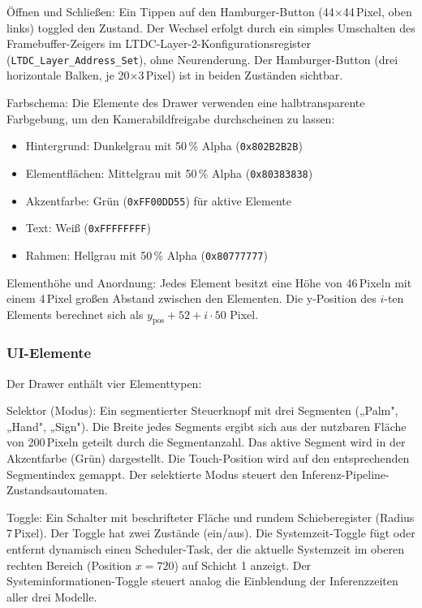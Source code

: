 Öffnen und Schließen: Ein Tippen auf den Hamburger-Button (44$\times$44\,Pixel, oben links) toggled den Zustand. Der Wechsel erfolgt durch ein simples Umschalten des Framebuffer-Zei\-gers im LTDC-Layer-2-Konfigurationsregister (\texttt{LTDC\_Layer\_Address\_Set}), ohne Neurenderung. Der Hamburger-Button (drei horizontale Balken, je 20$\times$3\,Pixel) ist in beiden Zuständen sichtbar.

Farbschema: Die Elemente des Drawer verwenden eine halbtransparente Farbgebung, um den Kamerabildfreigabe durchscheinen zu lassen:
\begin{itemize}
    \item Hintergrund: Dunkelgrau mit 50\,\% Alpha (\texttt{0x802B2B2B})
    \item Elementflächen: Mittelgrau mit 50\,\% Alpha (\texttt{0x80383838})
    \item Akzentfarbe: Grün (\texttt{0xFF00DD55}) für aktive Elemente
    \item Text: Weiß (\texttt{0xFFFFFFFF})
    \item Rahmen: Hellgrau mit 50\,\% Alpha (\texttt{0x80777777})
\end{itemize}

Elementhöhe und Anordnung: Jedes Element besitzt eine Höhe von 46\,Pixeln mit einem 4\,Pixel großen Abstand zwischen den Elementen. Die y-Position des $i$-ten Elements berechnet sich als $y_{\text{pos}} + 52 + i \cdot 50$ Pixel.

\subsubsection{UI-Elemente}\label{ssub:ui-elemente}

Der Drawer enthält vier Elementtypen:

Selektor (Modus): Ein segmentierter Steuerknopf mit drei Segmenten („Palm", „Hand", „Sign"). Die Breite jedes Segments ergibt sich aus der nutzbaren Fläche von 200\,Pixeln geteilt \linebreak durch die Segmentanzahl. Das aktive Segment wird in der Akzentfarbe (Grün) dargestellt. \linebreak Die Touch-Position wird auf den entsprechenden Segmentindex gemappt. Der selektierte Modus steuert den Inferenz-Pipeline-Zustandsautomaten.

Toggle: Ein Schalter mit beschrifteter Fläche und rundem Schieberegister (Radius 7\,Pixel). Der Toggle hat zwei Zustände (ein/aus). Die Systemzeit-Toggle fügt oder entfernt dynamisch einen Scheduler-Task, der die aktuelle Systemzeit im oberen rechten Bereich (Position $x = 720$) auf Schicht 1 anzeigt. Der Systeminformationen-Toggle steuert analog die Einblendung der Inferenzzeiten aller drei Modelle.

